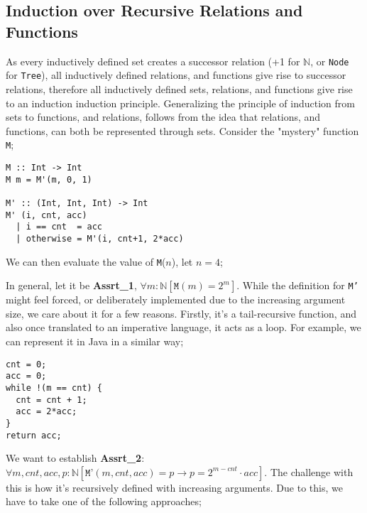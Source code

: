\documentclass[a4paper, 12pt]{article}
\newcommand{\proofeq}[3]{$#1$ & = $#2$ & \hfill #3 \smallskip \\}
\begin{document}
        \subsection*{Induction over Recursive Relations and Functions}
            As every inductively defined set creates a successor relation (+1 for $\mathbb{N}$, or \texttt{Node} for \texttt{Tree}), all inductively defined relations, and functions give rise to successor relations, therefore all inductively defined sets, relations, and functions give rise to an induction induction principle. Generalizing the principle of induction from sets to functions, and relations, follows from the idea that relations, and functions, can both be represented through sets. Consider the "mystery" function \texttt{M};
            \begin{verbatim}
M :: Int -> Int
M m = M'(m, 0, 1)

M' :: (Int, Int, Int) -> Int
M' (i, cnt, acc)
  | i == cnt  = acc
  | otherwise = M'(i, cnt+1, 2*acc)\end{verbatim}
            We can then evaluate the value of \texttt{M}($n$), let $n = 4$;
            In general, let it be \textbf{Assrt\_1}, $\forall m : \mathbb{N} [\texttt{M}(m) = 2^m]$. While the definition for \texttt{M'} might feel forced, or deliberately implemented due to the increasing argument size, we care about it for a few reasons. Firstly, it's a tail-recursive function, and also once translated to an imperative language, it acts as a loop. For example, we can represent it in Java in a similar way;
            \begin{verbatim}
cnt = 0;
acc = 0;
while !(m == cnt) {
  cnt = cnt + 1;
  acc = 2*acc;
}
return acc;\end{verbatim}
            We want to establish \textbf{Assrt\_2}: $\forall m, cnt, acc, p : \mathbb{N} [\texttt{M'}(m, cnt, acc) = p \rightarrow p = 2^{m - cnt} \cdot acc]$. The challenge with this is how it's recursively defined with increasing arguments. Due to this, we have to take one of the following approaches;
\end{document}
